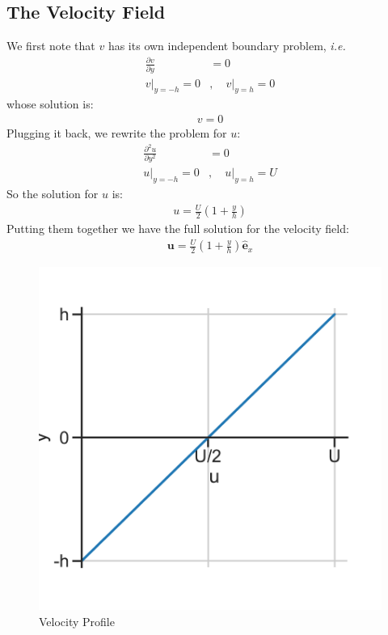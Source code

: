 \begin{solution}
    
  \subsection{The Velocity Field}
    We first note that $v$ has its own independent boundary problem, \emph{i.e.}
    \begin{align}
      \frac{\partial v}{\partial y}&=0 \\
      v\big|_{y=-h}=0&,\quad v\big|_{y=h}=0
    \end{align}
    whose solution is:
    \begin{align}
      v=0
    \end{align}
    Plugging it back, we rewrite the problem for $u$:
    \begin{align}
      \frac{\partial^2 u}{\partial y^2}&=0 \\
      u\big|_{y=-h}=0&,\quad u\big|_{y=h}=U
    \end{align}
    So the solution for $u$ is:
    \begin{align}
      u=\frac{U}{2}\left(1+\frac{y}{h}\right)
    \end{align}
    Putting them together we have the full solution for the velocity field:
    \begin{align}
      \mathbf{u}=\frac{U}{2}\left(1+\frac{y}{h}\right)\hat{\mathbf{e}}_x
    \end{align}
    \begin{figure}[H]
      \includegraphics[scale=0.5]{YX/velocity_profile.pdf}
      \centering
      \caption{Velocity Profile}
    \end{figure}
    
\end{solution}




